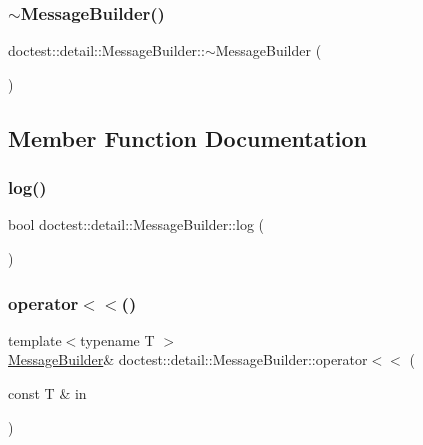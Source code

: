 \subsubsection{\texorpdfstring{$\sim$\+Message\+Builder()}{~MessageBuilder()}}
{\footnotesize\ttfamily doctest\+::detail\+::\+Message\+Builder\+::$\sim$\+Message\+Builder (\begin{DoxyParamCaption}{ }\end{DoxyParamCaption})}



\subsection{Member Function Documentation}
\mbox{\label{structdoctest_1_1detail_1_1MessageBuilder_a9bcc5d56e1764a7e07efebca55e43cce}} 
\subsubsection{\texorpdfstring{log()}{log()}}
{\footnotesize\ttfamily bool doctest\+::detail\+::\+Message\+Builder\+::log (\begin{DoxyParamCaption}{ }\end{DoxyParamCaption})}

\mbox{\label{structdoctest_1_1detail_1_1MessageBuilder_ab9059f961c58179c998c89fc221ec804}} 
\subsubsection{\texorpdfstring{operator$<$$<$()}{operator<<()}}
{\footnotesize\ttfamily template$<$typename T $>$ \\
\hyperlink{structdoctest_1_1detail_1_1MessageBuilder}{Message\+Builder}\& doctest\+::detail\+::\+Message\+Builder\+::operator$<$$<$ (\begin{DoxyParamCaption}\item[{const T \&}]{in }\end{DoxyParamCaption})\hspace{0.3cm}{\ttfamily [inline]}}

